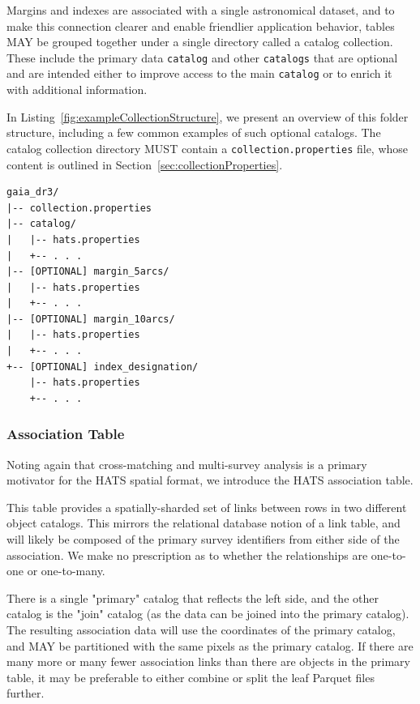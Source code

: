 \documentclass[11pt,a4paper]{ivoa}
\begin{document}
Margins and indexes are associated with a single astronomical dataset, and to make this connection clearer and enable friendlier application behavior, tables MAY be grouped together under a single directory called a catalog collection.
These include the primary data \texttt{catalog} and other \texttt{catalogs} that are optional and are intended either to improve access to the main \texttt{catalog} or to enrich it with additional information. 

In Listing~\ref{fig:exampleCollectionStructure}, we present an overview of this folder structure, including a few common examples of such optional catalogs.
The catalog collection directory MUST contain a \texttt{collection.properties} file, whose content is outlined in Section~\ref{sec:collectionProperties}.

\begin{minipage}{\linewidth}
\begin{lstlisting}[caption=Example collection directory contents, label=fig:exampleCollectionStructure]
gaia_dr3/
|-- collection.properties
|-- catalog/
|   |-- hats.properties
|   +-- . . .
|-- [OPTIONAL] margin_5arcs/
|   |-- hats.properties
|   +-- . . .
|-- [OPTIONAL] margin_10arcs/
|   |-- hats.properties
|   +-- . . .
+-- [OPTIONAL] index_designation/
    |-- hats.properties
    +-- . . .
\end{lstlisting}
\end{minipage}

\subsubsection{Association Table} \label{sec:association}

Noting again that cross-matching and multi-survey analysis is a primary motivator for the HATS spatial format, we introduce the HATS association table. 

This table provides a spatially-sharded set of links between rows in two different object catalogs. 
This mirrors the relational database notion of a link table, and will likely be composed of the primary survey identifiers from either side of the association.
We make no prescription as to whether the relationships are one-to-one or one-to-many. \par

There is a single "primary" catalog that reflects the left side, and the other catalog is the "join" catalog (as the data can be joined into the primary catalog).
The resulting association data will use the coordinates of the primary catalog, and MAY be partitioned with the same pixels as the primary catalog.
If there are many more or many fewer association links than there are objects in the primary table, it may be preferable to either combine or split the leaf Parquet files further.
\end{document}
